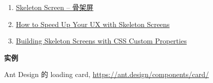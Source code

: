 \begin{enumerate}
\def\labelenumi{\arabic{enumi}.}
\tightlist
\item
  \href{http://www.bestvist.com/2018/01/19/skeleton-screen/}{Skeleton
  Screen -- 骨架屏}
\item
  \href{https://www.sitepoint.com/how-to-speed-up-your-ux-with-skeleton-screens/}{How
  to Speed Up Your UX with Skeleton Screens}
\item
  \href{https://css-tricks.com/building-skeleton-screens-css-custom-properties/}{Building
  Skeleton Screens with CSS Custom Properties}
\end{enumerate}

\textbf{实例}

Ant Design 的 loading card, \url{https://ant.design/components/card/}
